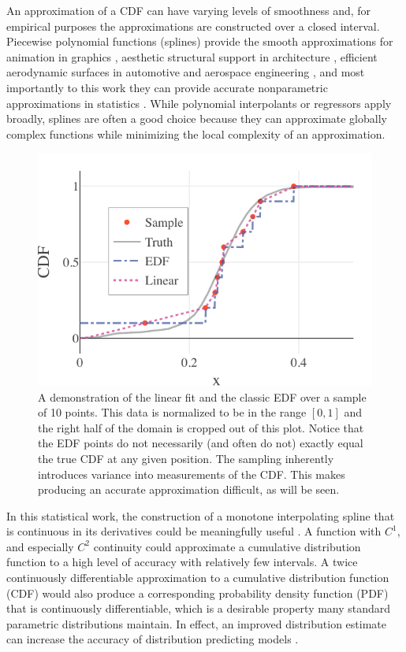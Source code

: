 \documentclass[letterpaper, 10 pt, conference]{IEEEtran}  %
\begin{document}
An approximation of a CDF can have varying levels of smoothness and, for empirical purposes the approximations are constructed over a closed interval. Piecewise polynomial functions (splines) provide the smooth approximations for animation in graphics \cite{herman2015techniques,quint2003scalable}, aesthetic structural support in architecture \cite{brennan2019measure}, efficient aerodynamic surfaces in automotive and aerospace engineering \cite{brennan2019measure}, and most importantly to this work they can provide accurate nonparametric approximations in statistics \cite{knott2012interpolating}. While polynomial interpolants or regressors apply broadly, splines are often a good choice because they can approximate globally complex functions while minimizing the local complexity of an approximation.

\begin{figure}
  \vspace{-.3cm}
  \includegraphics[width=.5\textwidth]{fl-sample-prediction.pdf}
  \caption{A demonstration of the linear fit and the classic EDF over a sample of 10 points. This data is normalized to be in the range $[0,1]$ and the right half of the domain is cropped out of this plot. Notice that the EDF points do not necessarily (and often do not) exactly equal the true CDF at any given position. The sampling inherently introduces variance into measurements of the CDF. This makes producing an accurate approximation difficult, as will be seen.
  \vspace{-.5cm}}
  \label{fig:sample-prediction}
\end{figure}

In this statistical work, the construction of a monotone interpolating spline that is continuous in its derivatives could be meaningfully useful \cite{ramsay1988monotone}. A function with $C^1$, and especially $C^2$ continuity could approximate a cumulative distribution function to a high level of accuracy with relatively few intervals. A twice continuously differentiable approximation to a cumulative distribution function (CDF) would also produce a corresponding probability density function (PDF) that is continuously differentiable, which is a desirable property many standard parametric distributions maintain. In effect, an improved distribution estimate can increase the accuracy of distribution predicting models \cite{xu2020modeling}.
\end{document}
